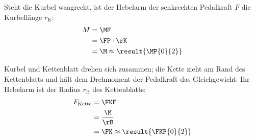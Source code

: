 \begin{abcliste}
\abc
Steht die Kurbel waagrecht, ist der Hebelarm der senkrechten Pedalkraft $F$ die Kurbellänge $r_\mathrm{K}$:
\begin{align}
 M &= \MF \\
   &= \FP\cdot\rK \\
   &= \M \approx \result{\MP{0}{2}}
\end{align}

\abc
Kurbel und Kettenblatt drehen sich zusammen; die Kette zieht am Rand des Kettenblatts und hält dem Drehmoment der Pedalkraft das Gleichgewicht. Ihr Hebelarm ist der Radius $r_\mathrm{B}$ des Kettenblatts:
\begin{align}
 F_\mathrm{Kette} &= \FKF \\
   &= \frac{\M}{\rB} \\
   &= \FK \approx \result{\FKP{0}{2}}
\end{align}
\end{abcliste}
